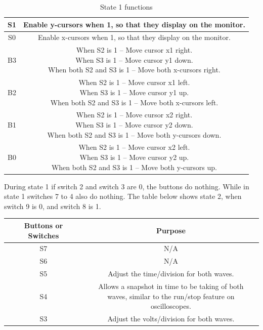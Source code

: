 \documentclass[a4paper,12pt]{article}
\newcommand{\squeezeup}{\vspace{-2.5mm}}
\begin{document}
\begin{flushleft}
\begin{center}
\begin{table}[H]
\begin{tabular}{|c|c|}
	\hline 
	S1 & Enable y-cursors when 1, so that they display on the monitor.
	 \\ 
	\hline 
	S0 & Enable x-cursors when 1, so that they display on the monitor. \\ 
	\hline 
	B3 & \makecell{When S2 is 1 – Move cursor x1 right.\\  When S3 is 1 – Move cursor y1 down.\\ When both S2 and S3 is 1 – Move both x-cursors right.}
	 \\ 
	\hline 
	B2 & \makecell{When S2 is 1 – Move cursor x1 left.\\ When S3 is 1 – Move cursor y1 up.\\ When both S2 and S3 is 1 – Move both x-cursors left.}
	 \\ 
	\hline 
	B1 & \makecell{When S2 is 1 – Move cursor x2 right.\\ When S3 is 1 – Move cursor y2 down.\\ When both S2 and S3 is 1 – Move both y-cursors down.} \\ 
	\hline 
	B0 & \makecell{When S2 is 1 – Move cursor x2 left.\\ When S3 is 1 – Move cursor y2 up.\\ When both S2 and S3 is 1 – Move both y-cursors up.}
	 \\ 
	\hline 
	\end{tabular} 
	\caption{State 1 functions}
\end{table}
\end{center}
\squeezeup
During state 1 if switch 2 and switch 3 are 0, the buttons do nothing. While in state 1 switches 7 to 4 also do nothing. The table below shows state 2, when switch 9 is 0, and switch 8 is 1.\\
\begin{center}
\begin{table}[H]
	\centering
	\begin{tabular}{|c|c|}
	\hline 
	\textbf{Buttons or Switches} & \textbf{Purpose} \\ 
	\hline 
	S7 & N/A \\ 
	\hline 
	S6 & N/A \\ 
	\hline 
	S5 & Adjust the time/division for both waves.  \\ 
	\hline 
	S4 & \makecell{Allows a snapshot in time to be taking of both\\ waves, similar to the run/stop feature on oscilloscopes.}  \\ 
	\hline 
	S3 & Adjust the volts/division for both waves. \\ 

\end{tabular}
\end{table}
\end{center}
\end{flushleft}
\end{document}

